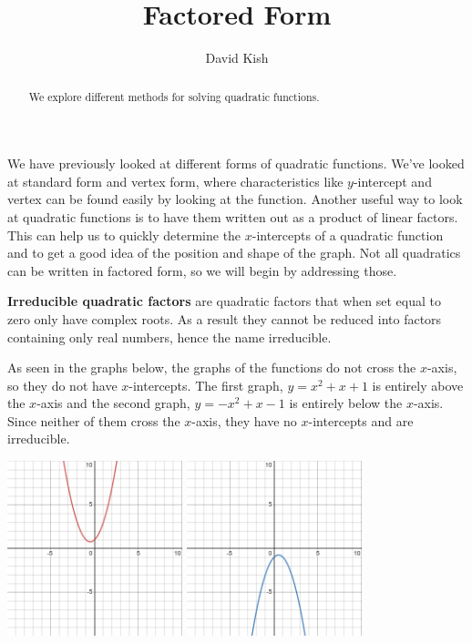 \documentclass{ximera}
\author{David Kish}
\title{Factored Form}
\begin{document}
\begin{abstract}
We explore different methods for solving quadratic functions.
\end{abstract}
\maketitle
We have previously looked at different forms of quadratic functions. We've looked at standard form and vertex form, where characteristics like $y$-intercept and vertex can be found easily by looking at the function. Another useful way to look at quadratic functions is to have them written out as a product of linear factors. This can help us to quickly determine the $x$-intercepts of a quadratic function and to get a good idea of the position and shape of the graph. Not all quadratics can be written in factored form, so we will begin by addressing those.
\begin{remark}
\textbf{Irreducible quadratic factors} are quadratic factors that when set equal to zero only have complex roots.  As a result they cannot be reduced into factors containing only real numbers, hence the name irreducible. 
\end{remark}
As seen in the graphs below, the graphs of the functions do not cross the $x$-axis, so they do not have $x$-intercepts. The first graph, $y=x^2+x+1$ is entirely above the $x$-axis and the second graph, $y=-x^2+x-1$ is entirely below the $x$-axis. Since neither of them cross the $x$-axis, they have no $x$-intercepts and are irreducible.
\begin{image}
\includegraphics[width=2in]{irreducible.PNG} \hfill \includegraphics[width=2in]{irreducible2.PNG}
\end{image}
\end{document}
